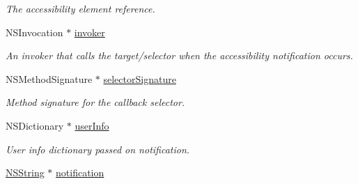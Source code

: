 \begin{DoxyCompactItemize}
\begin{DoxyCompactList}\small\item\em The accessibility element reference. \item\end{DoxyCompactList}\item 
\hypertarget{interface_g_d_accessibility_observer_a774accc02652787c3b86155670f429d0}{
NSInvocation $\ast$ \hyperlink{interface_g_d_accessibility_observer_a774accc02652787c3b86155670f429d0}{invoker}}
\label{interface_g_d_accessibility_observer_a774accc02652787c3b86155670f429d0}

\begin{DoxyCompactList}\small\item\em An invoker that calls the target/selector when the accessibility notification occurs. \item\end{DoxyCompactList}\item 
\hypertarget{interface_g_d_accessibility_observer_a2e79126b8de057ec798c5239121d5e1f}{
NSMethodSignature $\ast$ \hyperlink{interface_g_d_accessibility_observer_a2e79126b8de057ec798c5239121d5e1f}{selectorSignature}}
\label{interface_g_d_accessibility_observer_a2e79126b8de057ec798c5239121d5e1f}

\begin{DoxyCompactList}\small\item\em Method signature for the callback selector. \item\end{DoxyCompactList}\item 
\hypertarget{interface_g_d_accessibility_observer_a312f2dcd2e9adc830363f237d56b45e8}{
NSDictionary $\ast$ \hyperlink{interface_g_d_accessibility_observer_a312f2dcd2e9adc830363f237d56b45e8}{userInfo}}
\label{interface_g_d_accessibility_observer_a312f2dcd2e9adc830363f237d56b45e8}

\begin{DoxyCompactList}\small\item\em User info dictionary passed on notification. \item\end{DoxyCompactList}\item 
\hypertarget{interface_g_d_accessibility_observer_a273d26e83f52937320762c53857c6db1}{
\hyperlink{class_n_s_string}{NSString} $\ast$ \hyperlink{interface_g_d_accessibility_observer_a273d26e83f52937320762c53857c6db1}{notification}}
\label{interface_g_d_accessibility_observer_a273d26e83f52937320762c53857c6db1}


\end{DoxyCompactItemize}
